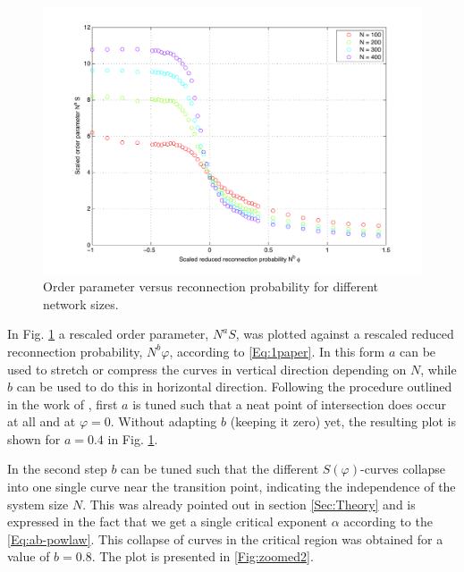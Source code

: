 \documentclass[11pt]{article}
\begin{document}
\begin{figure}[h]
  \centering
    \includegraphics[scale=0.7]{Plots/SvsPHI2.pdf}
  \caption{Order parameter versus reconnection probability for different network sizes.}
  \label{Fig:phicrit2}
\end{figure}

In Fig. \ref{Fig:phicrit2} a rescaled order parameter, $N^a S$, was plotted against a rescaled reduced reconnection probability, $N^b \varphi$, according to \eqref{Eq:1paper}. In this form $a$ can be used to stretch or compress the curves in vertical direction depending on $N$, while $b$ can be used to do this in horizontal direction. Following the procedure outlined in the work of \cite{main paper}, first $a$ is tuned such that a neat point of intersection does occur at all and at $\varphi=0$. Without adapting $b$ (keeping it zero) yet, the resulting plot is shown for $a=0.4$ in Fig. \ref{Fig:phicrit2}. 

In the second step $b$ can be tuned such that the different $S(\varphi)$-curves collapse into one single curve near the transition point, indicating the independence of the system size $N$. This was already pointed out in section \ref{Sec:Theory} and is expressed in the fact that we get a single critical exponent $\alpha$ according to the \eqref{Eq:ab-powlaw}. This collapse of curves in the critical region was obtained for a value of $b=0.8$. The plot is presented in \ref{Fig:zoomed2}.
\end{document}
